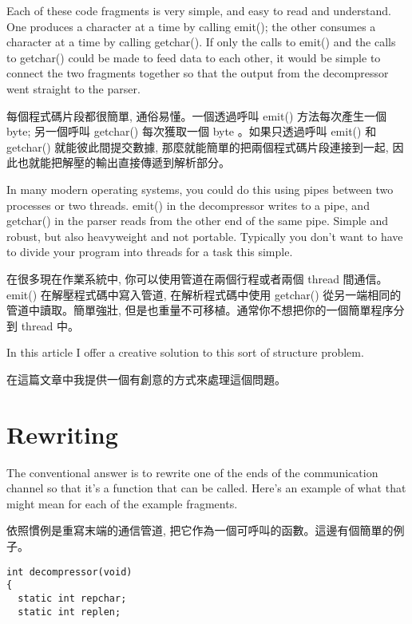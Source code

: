 \documentclass[12pt]{article}
\begin{document}
\begin{CJK}{UTF8}{bsmi}
\begin{multicols}{2}
\begin{lstlisting}[caption=parser, basicstyle=\footnotesize, breaklines=true, frame=single,frameround=tttt]
\end{lstlisting}
\end{multicols}

 Each of these code fragments is very simple, and easy to read and understand. One produces a character at a time by calling emit(); the other consumes a character at a time by calling getchar(). If only the calls to emit() and the calls to getchar() could be made to feed data to each other, it would be simple to connect the two fragments together so that the output from the decompressor went straight to the parser.

每個程式碼片段都很簡單, 通俗易懂。一個透過呼叫 emit() 方法每次產生一個 byte; 另一個呼叫 getchar() 每次獲取一個 byte 。如果只透過呼叫
emit() 和 getchar() 就能彼此間提交數據, 那麼就能簡單的把兩個程式碼片段連接到一起, 因此也就能把解壓的輸出直接傳遞到解析部分。

 In many modern operating systems, you could do this using pipes between two processes or two threads. emit() in the decompressor writes to a pipe, and getchar() in the parser reads from the other end of the same pipe. Simple and robust, but also heavyweight and not portable. Typically you don't want to have to divide your program into threads for a task this simple.

在很多現在作業系統中, 你可以使用管道在兩個行程或者兩個 thread 間通信。 emit() 在解壓程式碼中寫入管道, 在解析程式碼中使用
getchar() 從另一端相同的管道中讀取。簡單強壯, 但是也重量不可移植。通常你不想把你的一個簡單程序分到 thread 中。

In this article I offer a creative solution to this sort of structure problem. 

在這篇文章中我提供一個有創意的方式來處理這個問題。 

\section{Rewriting}
 The conventional answer is to rewrite one of the ends of the communication channel so that it's a function that can be called. Here's an example of what that might mean for each of the example fragments.

依照慣例是重寫末端的通信管道, 把它作為一個可呼叫的函數。這邊有個簡單的例子。 

\newpage
\begin{multicols}{2}

\begin{lstlisting}[caption=decompression, basicstyle=\footnotesize]
int decompressor(void) 
{
  static int repchar;
  static int replen;


\end{lstlisting}
\end{multicols}
\end{CJK}
\end{document}
